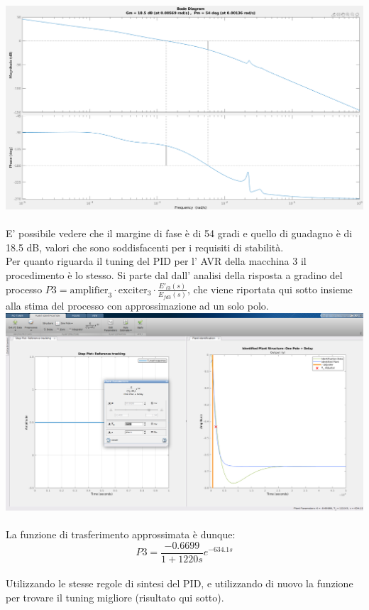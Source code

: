 \documentclass[Lau,noexaminfo]{sapthesis}
\begin{document}
	\includegraphics[angle=90,scale=0.4]{margin_P2}\\\\
	E' possibile vedere che il margine di fase è di 54 gradi e quello di guadagno è di 18.5 dB, valori che sono soddisfacenti per i requisiti di stabilità.\\
	Per quanto riguarda il tuning del PID per l' AVR della macchina 3 il procedimento è lo stesso. Si parte dal dall' analisi della risposta a gradino del processo $P3=\text{amplifier}_3\cdot\text{exciter}_3\cdot \frac{E'_{t3}(s)}{E_{fd3}(s)}$, che viene riportata qui sotto insieme alla stima del processo con approssimazione ad un solo polo.\\
	\includegraphics[scale=0.30,angle=-90]{P3_estimating}\\\\
	La funzione di trasferimento approssimata è dunque:\\
	\begin{equation*}
	P3=\frac{-0.6699}{1+1220s}e^{-634.1s}
	\end{equation*}\\
	Utilizzando le stesse regole di sintesi del PID, e utilizzando di nuovo la funzione per trovare il tuning migliore (risultato qui sotto).\\\\
\end{document}
